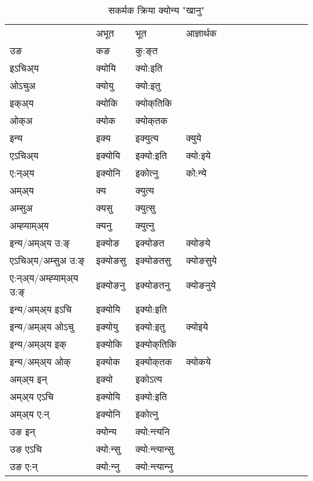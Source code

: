 \begin{table}[H]
\label{a.vt} \centering
\caption{सकर्मक क्रिया  क्योन्य  "खानु"  }
\begin{tabular}{l|l|l|l|l|l|l|l|l|l|l|l|l}  \toprule
&अभूत & भूत & आज्ञार्थक \\ 
उङ &कङ &कु:ङ्‌त \\ 
इऽचिअ्य &क्योयि &क्यो:इति   \\ 
ओऽचुअ &क्योयु &क्यो:इतु   \\ 
इक्अ्य &क्योकि &क्योक्‌तिकि   \\ 
ओक्अ &क्योक &क्योक्‌तक   \\ 
इन्य & इक्य & इक्युत्य &क्युये  \\ 
एऽचिअ्य & इक्योयि & इक्यो:इति &क्यो:इये    \\ 
ए:न्अ्य & इक्योनि  & इकोत्‍नु &को:न्ये  \\ 
अम्अ्य & क्य & क्युत्य   \\ 
अम्सुअ & क्यसु & क्युत्सु     \\ 
अम्ह्‍याम्अ्य & क्यनु  & क्युत्‍नु \\ 
\midrule
इन्य/अम्अ्य उ:ङ्‌&इक्योङ &इक्योङत &क्योङये \\ 
एऽचिअ्य/अम्सुअ उ:ङ्‌ &इक्योङसु &इक्योङतसु &क्योङसुये \\ 
ए:न्अ्य/अम्ह्‍याम्अ्य उ:ङ्‌ &इक्योङनु &इक्योङतनु &क्योङनुये \\ 
इन्य/अम्अ्य इऽचि &इक्योयि &इक्यो:इति    \\ 
इन्य/अम्अ्य ओऽचु &इक्योयु &इक्यो:इतु  &क्योइये  \\ 
इन्य/अम्अ्य इक् &इक्योकि &इक्योक्‌तिकि   \\ 
इन्य/अम्अ्य ओक् &इक्योक &इक्योक्‌तक  &क्योकये  \\ 
अम्अ्य इन् & इक्यो & इकोऽत्य   \\ 
अम्अ्य एऽचि & इक्योयि & इक्यो:इति     \\ 
अम्अ्य ए:न् & इक्योनि  & इकोत्‍नु  \\ 
\midrule
उङ इन् & क्योन्य  & क्यो:न्त्यनि  \\ 
उङ एऽचि & क्यो:न्सु  & क्यो:न्त्यान्सु   \\ 
उङ ए:न्& क्यो:न्‍नु  & क्यो:न्त्यान्‍नु   \\ 
\bottomrule
\end{tabular}
\end{table}


